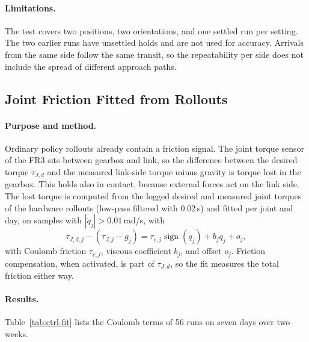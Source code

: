 \paragraph{Limitations.} The test covers two positions, two orientations, and one settled run per setting. The two earlier runs have unsettled holds and are not used for accuracy. Arrivals from the same side follow the same transit, so the repeatability per side does not include the spread of different approach paths.

\subsection{Joint Friction Fitted from Rollouts}\label{sec:app-ctrl-fit}

\paragraph{Purpose and method.} Ordinary policy rollouts already contain a friction signal. The joint torque sensor of the \ac{FR3} sits between gearbox and link, so the difference between the desired torque $\tau_{J,d}$ and the measured link-side torque minus gravity is torque lost in the gearbox. This holds also in contact, because external forces act on the link side. The lost torque is computed from the logged desired and measured joint torques of the hardware rollouts (low-pass filtered with 0.02\,s) and fitted per joint and day, on samples with $|\dot{q}_j|>0.01$\,rad/s, with
\begin{equation}\label{eq:friction-fit}
  \tau_{J,d,j}-\left(\tau_{J,j}-g_j\right)=\tau_{c,j}\operatorname{sign}(\dot{q}_j)+b_j\dot{q}_j+o_j,
\end{equation}
with Coulomb friction $\tau_{c,j}$, viscous coefficient $b_j$, and offset $o_j$. Friction compensation, when activated, is part of $\tau_{J,d}$, so the fit measures the total friction either way.

\paragraph{Results.} Table~\ref{tab:ctrl-fit} lists the Coulomb terms of 56 runs on seven days over two weeks.

